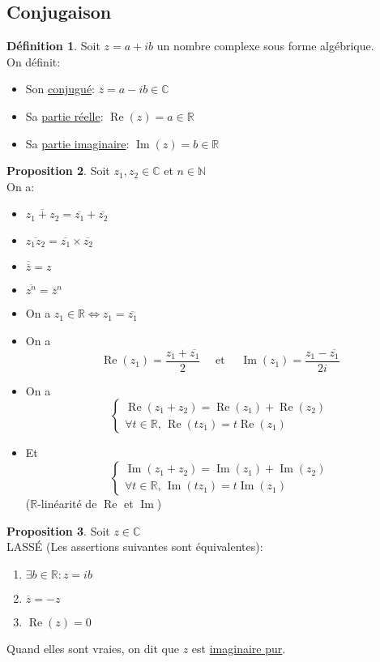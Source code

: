 \documentclass[10pt,a4paper]{article}
\theoremstyle{definition}
\newtheorem{proposition}{Proposition}[section]
\newtheorem{definition}[proposition]{Définition}
\DeclareMathOperator{\re}{Re}
\DeclareMathOperator{\im}{Im}
\begin{document}
\subsection{Conjugaison}
\begin{definition}
Soit $z = a + ib$ un nombre complexe sous forme algébrique. \\
On définit:
\begin{itemize}
\item Son \uline{conjugué}: $\overline{z} = a - ib \in \mathbb{C}$
\item Sa \uline{partie réelle}: $\re(z) = a \in \mathbb{R}$
\item Sa \uline{partie imaginaire}: $\im(z) = b \in \mathbb{R}$
\end{itemize}
\end{definition}
\begin{proposition}
Soit $z_1, z_2 \in \mathbb{C}$ et $n \in \mathbb{N}$ \\
On a:
\begin{itemize}
\item $\overline{z_1 + z_2} = \overline{z_1} + \overline{z_2}$
\item $\overline{z_1 z_2} = \overline{z_1} \times \overline{z_2}$
\item $\overline{\overline{z}} = z$
\item $\overline{z^n} = \overline{z}^n$
\item On a $z_1 \in \mathbb{R} \iff z_1 = \overline{z_1}$
\item On a
\[\re(z_1) = \frac{z_1 + \overline{z_1}}{2} \quad \text{ et } \quad \im(z_1) = \frac{z_1 - \overline{z_1}}{2i} \]
\item On a
\[\begin{cases}
\re(z_1 + z_2) = \re(z_1) + \re(z_2) \\
\forall t \in \mathbb{R},\, \re(t z_1) = t \re(z_1)
\end{cases}\]
\item Et
\[\begin{cases}
\im(z_1 + z_2) = \im(z_1) + \im(z_2) \\
\forall t \in \mathbb{R},\, \im(t z_1) = t \im(z_1)
\end{cases}\] ($\mathbb{R}$-linéarité de $\re$ et $\im$)
\end{itemize}
\end{proposition}

\pagebreak

\begin{proposition}
Soit $z \in \mathbb{C}$ \\
LASSÉ (Les assertions suivantes sont équivalentes):
\begin{enumerate}
\item $\exists b \in \mathbb{R}: z = ib$
\item $\overline{z} = -z$
\item $\re(z) = 0$
\end{enumerate}
Quand elles sont vraies, on dit que $z$ est \uline{imaginaire pur}.
\end{proposition}
\end{document}
